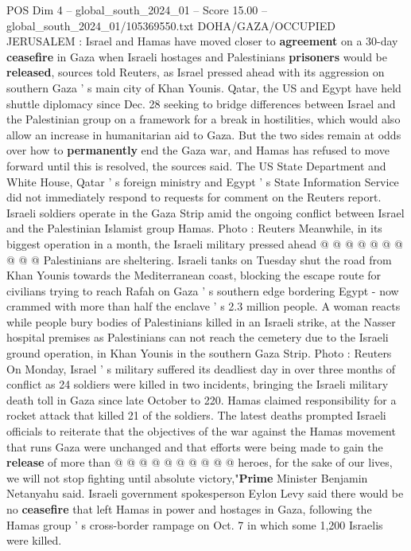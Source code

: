 \begin{textsample}{POS Dim 4 – global\_south\_2024\_01 – Score 15.00 – global\_south\_2024\_01/105369550.txt}  \label{ex:f4_pos_373}
DOHA/GAZA/OCCUPIED JERUSALEM : Israel and Hamas have moved closer to \textbf{agreement} on a 30-day \textbf{ceasefire} in Gaza when Israeli hostages and Palestinians \textbf{prisoners} would be \textbf{released}, sources told Reuters, as Israel pressed ahead with its aggression on southern Gaza ' s main city of Khan Younis.
Qatar, the US and Egypt have held shuttle diplomacy since Dec. 28 seeking to bridge differences between Israel and the Palestinian group on a framework for a break in hostilities, which would also allow an increase in humanitarian aid to Gaza.
But the two sides remain at odds over how to \textbf{permanently} end the Gaza war, and Hamas has refused to move forward until this is resolved, the sources said.
The US State Department and White House, Qatar ' s foreign ministry and Egypt ' s State Information Service did not immediately respond to requests for comment on the Reuters report.
Israeli soldiers operate in the Gaza Strip amid the ongoing conflict between Israel and the Palestinian Islamist group Hamas.
Photo : Reuters Meanwhile, in its biggest operation in a month, the Israeli military pressed ahead @ @ @ @ @ @ @ @ @ @ Palestinians are sheltering.
Israeli tanks on Tuesday shut the road from Khan Younis towards the Mediterranean coast, blocking the escape route for civilians trying to reach Rafah on Gaza ' s southern edge bordering Egypt - now crammed with more than half the enclave ' s 2.3 million people.
A woman reacts while people bury bodies of Palestinians killed in an Israeli strike, at the Nasser hospital premises as Palestinians can not reach the cemetery due to the Israeli ground operation, in Khan Younis in the southern Gaza Strip.
Photo : Reuters On Monday, Israel ' s military suffered its deadliest day in over three months of conflict as 24 soldiers were killed in two incidents, bringing the Israeli military death toll in Gaza since late October to 220.
Hamas claimed responsibility for a rocket attack that killed 21 of the soldiers.
The latest deaths prompted Israeli officials to reiterate that the objectives of the war against the Hamas movement that runs Gaza were unchanged and that efforts were being made to gain the \textbf{release} of more than @ @ @ @ @ @ @ @ @ @ heroes, for the sake of our lives, we will not stop fighting until absolute victory,"\textbf{Prime} Minister Benjamin Netanyahu said.
Israeli government spokesperson Eylon Levy said there would be no \textbf{ceasefire} that left Hamas in power and hostages in Gaza, following the Hamas group ' s cross-border rampage on Oct. 7 in which some 1,200 Israelis were killed.

\end{textsample}
